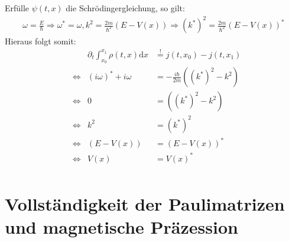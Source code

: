 \documentclass[a4paper,11pt]{article}
\begin{document}
Erfülle $\psi(t, x)$ die Schrödingergleichung, so gilt:
\begin{align}
        \omega = \frac{E}{\hbar} \Rightarrow \omega^* = \omega, k^2 = \frac{2m}{\hbar^2}(E-V(x)) \Rightarrow (k^*)^2 = \frac{2m}{\hbar^2}(E-V(x))^*
\end{align}
Hieraus folgt somit:
\begin{equation}
        \begin{aligned}
                &                 & \partial_t \int_{x_0}^{x_1} \rho(t, x)\text{d}x & \overset{!}{=} j(t, x_0) - j(t, x_1) \\
                & \Leftrightarrow & (i\omega)^* + i\omega                           & = -\frac{i\hbar}{2m}((k^*)^2 - k^2) \\
                & \Leftrightarrow & 0                                               & = ((k^*)^2 - k^2) \\
                & \Leftrightarrow & k^2                                             & = (k^*)^2 \\
                & \Leftrightarrow & (E-V(x))                                        & = (E-V(x))^* \\
                & \Leftrightarrow & V(x)                                            & = V(x)^* \\
        \end{aligned}
\end{equation}

\section{Vollständigkeit der Paulimatrizen und magnetische Präzession}
\end{document}
